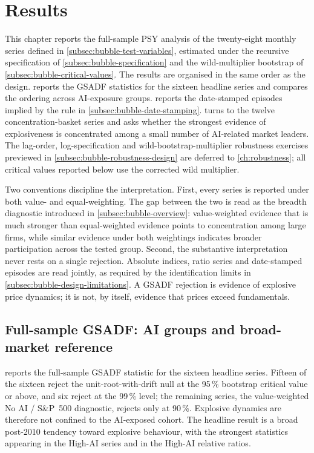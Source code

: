 \chapter{Results}
\label{ch:results}
 
This chapter reports the full-sample PSY analysis of the twenty-eight monthly series defined in \cref{subsec:bubble-test-variables}, estimated under the recursive specification of \cref{subsec:bubble-specification} and the wild-multiplier bootstrap of \cref{subsec:bubble-critical-values}. The results are organised in the same order as the design.  reports the GSADF statistics for the sixteen headline series and compares the ordering across AI-exposure groups.  reports the date-stamped episodes implied by the rule in \cref{subsec:bubble-date-stamping}.  turns to the twelve concentration-basket series and asks whether the strongest evidence of explosiveness is concentrated among a small number of AI-related market leaders. The lag-order, log-specification and wild-bootstrap-multiplier robustness exercises previewed in \cref{subsec:bubble-robustness-design} are deferred to \cref{ch:robustness}; all critical values reported below use the corrected wild multiplier.
 
Two conventions discipline the interpretation. First, every series is reported under both value- and equal-weighting. The gap between the two is read as the breadth diagnostic introduced in \cref{subsec:bubble-overview}: value-weighted evidence that is much stronger than equal-weighted evidence points to concentration among large firms, while similar evidence under both weightings indicates broader participation across the tested group. Second, the substantive interpretation never rests on a single rejection. Absolute indices, ratio series and date-stamped episodes are read jointly, as required by the identification limits in \cref{subsec:bubble-design-limitations}. A GSADF rejection is evidence of explosive price dynamics; it is not, by itself, evidence that prices exceed fundamentals.
 
\section{Full-sample GSADF: AI groups and broad-market reference}
\label{sec:results-headline}
 
 reports the full-sample GSADF statistic for the sixteen headline series. Fifteen of the sixteen reject the unit-root-with-drift null at the 95\,\% bootstrap critical value or above, and six reject at the 99\,\% level; the remaining series, the value-weighted No AI / S\&P~500 diagnostic, rejects only at 90\,\%. Explosive dynamics are therefore not confined to the AI-exposed cohort. The headline result is a broad post-2010 tendency toward explosive behaviour, with the strongest statistics appearing in the High-AI series and in the High-AI relative ratios.
 

